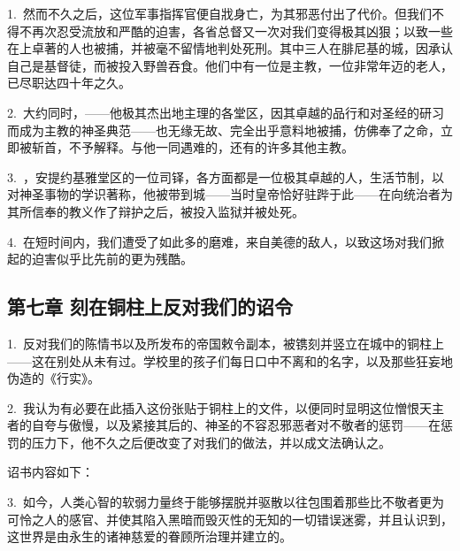1.\ 然而不久之后，这位军事指挥官便自戕身亡，为其邪恶付出了代价。但我们不得不再次忍受流放和严酷的迫害，各省总督又一次对我们变得极其凶狠；以致一些在上卓著的人也被捕，并被毫不留情地判处死刑。其中三人在腓尼基的城，因承认自己是基督徒，而被投入野兽吞食。他们中有一位是主教，一位非常年迈的老人，已尽职达四十年之久。\par

2.\ 大约同时，——他极其杰出地主理的各堂区，因其卓越的品行和对圣经的研习而成为主教的神圣典范——也无缘无故、完全出乎意料地被捕，仿佛奉了之命，立即被斩首，不予解释。与他一同遇难的，还有的许多其他主教。\par

3.\ ，安提约基雅堂区的一位司铎，各方面都是一位极其卓越的人，生活节制，以对神圣事物的学识著称，他被带到城——当时皇帝恰好驻跸于此——在向统治者为其所信奉的教义作了辩护之后，被投入监狱并被处死。\par

4.\ 在短时间内，我们遭受了如此多的磨难，来自美德的敌人，以致这场对我们掀起的迫害似乎比先前的更为残酷。\par


\subsection{第七章 刻在铜柱上反对我们的诏令}

1.\ 反对我们的陈情书以及所发布的帝国敕令副本，被镌刻并竖立在城中的铜柱上——这在别处从未有过。学校里的孩子们每日口中不离和的名字，以及那些狂妄地伪造的《行实》。\par

2.\ 我认为有必要在此插入这份张贴于铜柱上的文件，以便同时显明这位憎恨天主者的自夸与傲慢，以及紧接其后的、神圣的不容忍邪恶者对不敬者的惩罚——在惩罚的压力下，他不久之后便改变了对我们的做法，并以成文法确认之。\par

诏书内容如下：\par

\par

3.\ 如今，人类心智的软弱力量终于能够摆脱并驱散以往包围着那些比不敬者更为可怜之人的感官、并使其陷入黑暗而毁灭性的无知的一切错误迷雾，并且认识到，这世界是由永生的诸神慈爱的眷顾所治理并建立的。\par

